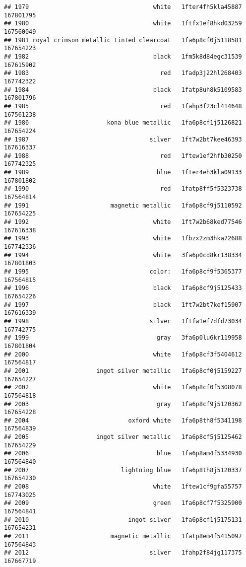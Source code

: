 \documentclass[
]{article}
\begin{document}
\begin{verbatim}
## 1979                                   white   1fter4fh5kla45887 167801795
## 1980                                   white   1ftfx1ef8hkd03259 167560049
## 1981 royal crimson metallic tinted clearcoat   1fa6p8cf0j5118581 167654223
## 1982                                   black   1fm5k8d84egc31539 167615902
## 1983                                     red   1fadp3j22hl268403 167742322
## 1984                                   black   1fatp8uh8k5109583 167801796
## 1985                                     red   1fahp3f23cl414648 167561238
## 1986                      kona blue metallic   1fa6p8cf1j5126821 167654224
## 1987                                  silver   1ft7w2bt7kee46393 167616337
## 1988                                     red   1ftew1ef2hfb30250 167742325
## 1989                                    blue   1fter4eh3kla09133 167801802
## 1990                                     red   1fatp8ff5f5323738 167564814
## 1991                       magnetic metallic   1fa6p8cf9j5110592 167654225
## 1992                                   white   1ft7w2b68ked77546 167616338
## 1993                                   white   1fbzx2zm3hka72688 167742336
## 1994                                   white   3fa6p0cd8kr138334 167801803
## 1995                                  color:   1fa6p8cf9f5365377 167564815
## 1996                                   black   1fa6p8cf9j5125433 167654226
## 1997                                   black   1ft7w2bt7kef15907 167616339
## 1998                                  silver   1ftfw1ef7dfd73034 167742775
## 1999                                    gray   3fa6p0lu6kr119958 167801804
## 2000                                   white   1fa6p8cf3f5404612 167564817
## 2001                   ingot silver metallic   1fa6p8cf0j5159227 167654227
## 2002                                   white   1fa6p8cf0f5308078 167564818
## 2003                                    gray   1fa6p8cf9j5120362 167654228
## 2004                            oxford white   1fa6p8th8f5341198 167564839
## 2005                   ingot silver metallic   1fa6p8cf5j5125462 167654229
## 2006                                    blue   1fa6p8am4f5334930 167564840
## 2007                          lightning blue   1fa6p8th8j5120337 167654230
## 2008                                   white   1ftew1cf9gfa55757 167743025
## 2009                                   green   1fa6p8cf7f5325900 167564841
## 2010                            ingot silver   1fa6p8cf1j5175131 167654231
## 2011                       magnetic metallic   1fatp8em4f5415097 167564843
## 2012                                  silver   1fahp2f84jg117375 167667719

\end{verbatim}
\end{document}
